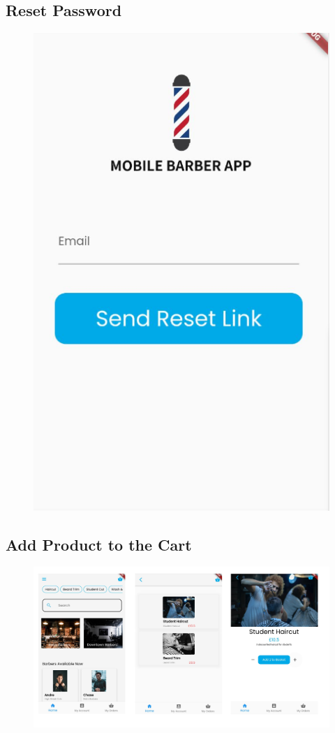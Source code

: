 \documentclass[12pt]{article}
\begin{document}
	\subsection{Reset Password}
	\label{app-image: reset-password}
	\begin{figure}[H]
		\centering
		\includegraphics[scale=0.4]{images/reset-password.png}
	\end{figure}

	\subsection{Add Product to the Cart}
	\label{app-image: cart}
	\begin{figure}[H]
		\centering
		\includegraphics[scale=0.22]{images/add-to-cart.png}
	\end{figure}
\end{document}
